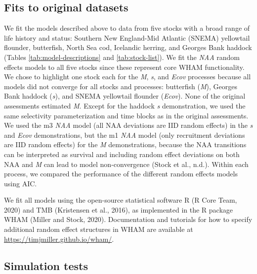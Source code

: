 \documentclass[]{article}
\begin{document}
\hypertarget{fits-to-original-datasets}{%
\subsection{Fits to original datasets}\label{fits-to-original-datasets}}

We fit the models described above to data from five stocks with a broad
range of life history and status: Southern New England-Mid Atlantic
(SNEMA) yellowtail flounder, butterfish, North Sea cod, Icelandic
herring, and Georges Bank haddock (Tables \ref{tab:model-descriptions}
and \ref{tab:stock-list}). We fit the \emph{NAA} random effects models
to all five stocks since these represent core WHAM functionality. We
chose to highlight one stock each for the \emph{M}, \emph{s}, and
\emph{Ecov} processes because all models did not converge for all stocks
and processes: butterfish (\emph{M}), Georges Bank haddock (\emph{s}),
and SNEMA yellowtail flounder (\emph{Ecov}). None of the original
assessments estimated \emph{M}. Except for the haddock \emph{s}
demonstration, we used the same selectivity parameterization and time
blocks as in the original assessments. We used the m3 \emph{NAA} model
(all NAA deviations are IID random effects) in the \emph{s} and
\emph{Ecov} demonstrations, but the m1 \emph{NAA} model (only
recruitment deviations are IID random effects) for the \emph{M}
demonstrations, because the NAA transitions can be interpreted as
survival and including random effect deviations on both NAA and \emph{M}
can lead to model non-convergence (Stock et al., n.d.). Within each
process, we compared the performance of the different random effects
models using AIC.

We fit all models using the open-source statistical software R (R Core
Team, 2020) and TMB (Kristensen et al., 2016), as implemented in the R
package WHAM (Miller and Stock, 2020). Documentation and tutorials for
how to specify additional random effect structures in WHAM are available
at \url{https://timjmiller.github.io/wham/}.

\hypertarget{simulation-tests}{%
\subsection{Simulation tests}\label{simulation-tests}}
\end{document}
